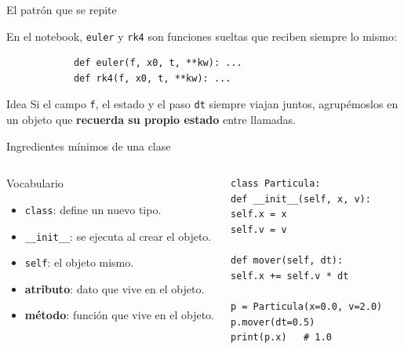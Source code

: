 \documentclass[aspectratio=169,10pt]{beamer}
\begin{document}
	\begin{frame}[fragile]{El patr\'on que se repite}
		
		\vspace{2pt}
		En el notebook, \texttt{euler} y \texttt{rk4} son funciones sueltas
		que reciben siempre lo mismo:
		
		\begin{lstlisting}
			def euler(f, x0, t, **kw): ...
			def rk4(f, x0, t, **kw): ...
		\end{lstlisting}
		
		\vspace{6pt}
		\begin{obsbox}{Idea}
			Si el campo \texttt{f}, el estado y el paso \texttt{dt} siempre viajan
			juntos, agrup\'emoslos en un objeto que \textbf{recuerda su propio
				estado} entre llamadas.
		\end{obsbox}
	\end{frame}
	
	\begin{frame}[fragile]{Ingredientes m\'inimos de una clase}
		\vspace{2pt}
		\begin{columns}[T]
			\begin{defbox}{Vocabulario}
				\begin{itemize}\small
					\item \texttt{class}: define un nuevo tipo.
					\item \texttt{\_\_init\_\_}: se ejecuta al crear el objeto.
					\item \texttt{self}: el objeto mismo.
					\item \textbf{atributo}: dato que vive en el objeto.
					\item \textbf{m\'etodo}: funci\'on que vive en el objeto.
				\end{itemize}
			\end{defbox}
			
\begin{lstlisting}
class Particula:
def __init__(self, x, v):
self.x = x
self.v = v

def mover(self, dt):
self.x += self.v * dt

p = Particula(x=0.0, v=2.0)
p.mover(dt=0.5)
print(p.x)   # 1.0
\end{lstlisting}
		\end{columns}
	\end{frame}
	
\end{document}
